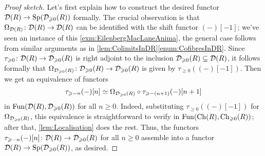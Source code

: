 \begin{proof}[Proof sketch]
	Let's first explain how to construct the desired functor $\mathcal{D}(R)\rightarrow \mathrm{Sp}(\mathcal{D}_{\geqslant 0}(R))$ formally. The crucial observation is that $\Omega_{\mathcal{D}(R)}\colon \mathcal{D}(R)\rightarrow \mathcal{D}(R)$ can be identified with the shift functor $(-)[-1]$; we've seen an instance of this \cref{exm:EilenbergMacLaneAnima}, the general case follows from similar arguments as in \cref{lem:ColimitsInDR}\cref{enum:CofibresInDR}. Since $\tau_{\geqslant0}\colon \mathcal{D}(R)\rightarrow \mathcal{D}_{\geqslant 0}(R)$ is right adjoint to the inclusion $\mathcal{D}_{\geqslant 0}(R)\subseteq \mathcal{D}(R)$, it follows formally that $\Omega_{\mathcal{D}_{\geqslant 0}(R)}\colon \mathcal{D}_{\geqslant 0}(R)\rightarrow\mathcal{D}_{\geqslant 0}(R)$ is given by $\tau_{\geqslant 0}((-)[-1])$. Then we get an equivalence of functors
	\begin{equation*}
		\tau_{\geqslant -n}(-)[n]\simeq \Omega_{\mathcal{D}_{\geqslant 0}(R)}\circ \tau_{\geqslant -(n+1)}(-)[n+1]
	\end{equation*}
	in $\operatorname{Fun}(\mathcal{D}(R),\mathcal{D}_{\geqslant 0}(R))$ for all $n\geqslant 0$. Indeed, substituting $\tau_{\geqslant 0}((-)[-1])$ for $\Omega_{\mathcal{D}_{\geqslant 0}(R)}$, this equivalence is straightforward to verify in $\operatorname{Fun}(\operatorname{Ch}(R),\operatorname{Ch}_{\geqslant 0}(R))$; after that, \cref{lem:Localisation} does the rest. Thus, the functors $\tau_{\geqslant -n}(-)[n]\colon \mathcal{D}(R)\rightarrow \mathcal{D}_{\geqslant 0}(R)$ for all $n\geqslant 0$ assemble into a functor $\mathcal{D}(R)\rightarrow \mathrm{Sp}(\mathcal{D}_{\geqslant 0}(R))$, as desired.
	

\end{proof}
